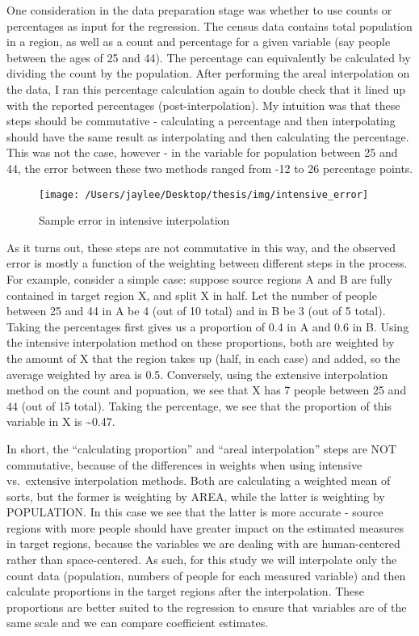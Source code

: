 \documentclass[12pt,twoside]{reedthesis}
\theoremstyle{definition}
\theoremstyle{definition}
\theoremstyle{definition}
\theoremstyle{remark}
\begin{document}
One consideration in the data preparation stage was whether to use
counts or percentages as input for the regression. The census data
contains total population in a region, as well as a count and percentage
for a given variable (say people between the ages of 25 and 44). The
percentage can equivalently be calculated by dividing the count by the
population. After performing the areal interpolation on the data, I ran
this percentage calculation again to double check that it lined up with
the reported percentages (post-interpolation). My intuition was that
these steps should be commutative - calculating a percentage and then
interpolating should have the same result as interpolating and then
calculating the percentage. This was not the case, however - in the
variable for population between 25 and 44, the error between these two
methods ranged from -12 to 26 percentage points.
\begin{figure}
\texttt{[image: /Users/jaylee/Desktop/thesis/img/intensive\_error]} \caption{Sample error in intensive interpolation}\label{fig:unnamed-chunk-6}
\end{figure}
As it turns out, these steps are not commutative in this way, and the
observed error is mostly a function of the weighting between different
steps in the process. For example, consider a simple case: suppose
source regions A and B are fully contained in target region X, and split
X in half. Let the number of people between 25 and 44 in A be 4 (out of
10 total) and in B be 3 (out of 5 total). Taking the percentages first
gives us a proportion of 0.4 in A and 0.6 in B. Using the intensive
interpolation method on these proportions, both are weighted by the
amount of X that the region takes up (half, in each case) and added, so
the average weighted by area is 0.5. Conversely, using the extensive
interpolation method on the count and popuation, we see that X has 7
people between 25 and 44 (out of 15 total). Taking the percentage, we
see that the proportion of this variable in X is \textasciitilde{}0.47.

In short, the ``calculating proportion'' and ``areal interpolation''
steps are NOT commutative, because of the differences in weights when
using intensive vs.~extensive interpolation methods. Both are
calculating a weighted mean of sorts, but the former is weighting by
AREA, while the latter is weighting by POPULATION. In this case we see
that the latter is more accurate - source regions with more people
should have greater impact on the estimated measures in target regions,
because the variables we are dealing with are human-centered rather than
space-centered. As such, for this study we will interpolate only the
count data (population, numbers of people for each measured variable)
and then calculate proportions in the target regions after the
interpolation. These proportions are better suited to the regression to
ensure that variables are of the same scale and we can compare
coefficient estimates.
\end{document}
